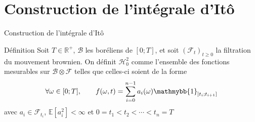 \documentclass{beamer}
\newcommand{\1}{\mathmybb{1}}
\begin{document}
 \section{Construction de l'intégrale d'Itô}
 \begin{frame}{Construction de l'intégrale d'Itô}
   \begin{block}{Définition}
     Soit $ T \in \mathbb{R}^{+}$, $\mathcal{B}$ les boréliens de $ \left[0; T  \right]$, et soit $ (\mathcal{F}_{t})_{t \geq 0}$ la filtration du mouvement brownien. On définit $\mathcal{H}^{2}_{0}$ comme l'ensemble des fonctions mesurables sur $\mathcal{B} \otimes \mathcal{F}$ telles que celles-ci soient de la forme 
     \[
       \forall \omega \in [0; T], \qquad f(\omega, t) = \sum_{i=0}^{n-1}a_{i}(\omega) \1_{\left] t_{i} ; t_{i+1} \right] }
     \]
     avec $a_{i} \in \mathcal{F}_{t_{i}}$, $\mathbb{E}\left[ a_{i}^{2} \right] < \infty$ et $0 = t_{1} < t_{2} < \cdots < t_{n} = T$
     \end{block}
    \end{frame}
\end{document}
